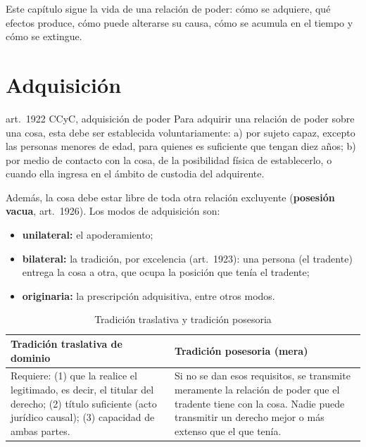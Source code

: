 \documentclass[12pt,oneside]{book}
\begin{document}
Este capítulo sigue la vida de una relación de poder: cómo se adquiere, qué efectos produce, cómo puede alterarse su causa, cómo se acumula en el tiempo y cómo se extingue.

\section{Adquisición}

\begin{regla}{art.~1922 CCyC, adquisición de poder}
Para adquirir una relación de poder sobre una cosa, esta debe ser establecida voluntariamente: a) por sujeto capaz, excepto las personas menores de edad, para quienes es suficiente que tengan diez años; b) por medio de contacto con la cosa, de la posibilidad física de establecerlo, o cuando ella ingresa en el ámbito de custodia del adquirente.
\end{regla}

Además, la cosa debe estar libre de toda otra relación excluyente (\textbf{posesión vacua}, art.~1926). Los modos de adquisición son:

\begin{itemize}
    \item \textbf{unilateral:} el apoderamiento;
    \item \textbf{bilateral:} la tradición, por excelencia (art.~1923): una persona (el tradente) entrega la cosa a otra, que ocupa la posición que tenía el tradente;
    \item \textbf{originaria:} la prescripción adquisitiva, entre otros modos.
\end{itemize}

\begin{table}[H]
\centering
\small
\begin{tabularx}{\textwidth}{>{\raggedright\arraybackslash}X>{\raggedright\arraybackslash}X}
\toprule
\textbf{Tradición traslativa de dominio} & \textbf{Tradición posesoria (mera)} \\
\midrule
Requiere: (1) que la realice el legitimado, es decir, el titular del derecho; (2) título suficiente (acto jurídico causal); (3) capacidad de ambas partes. & Si no se dan esos requisitos, se transmite meramente la relación de poder que el tradente tiene con la cosa. Nadie puede transmitir un derecho mejor o más extenso que el que tenía. \\
\bottomrule
\end{tabularx}
\caption{Tradición traslativa y tradición posesoria}
\end{table}
\end{document}
